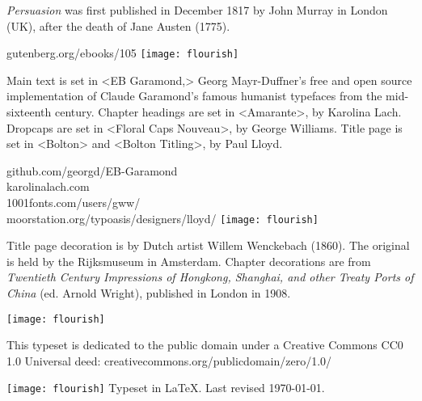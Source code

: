 \documentclass[
paper=5.5in:8.5in
]{scrbook}
\begin{document}
\vfill
\begin{minipage}{\textwidth}
\textit{Persuasion} was first published in December 1817 by John Murray in London (UK), after the death of Jane Austen (1775).
\end{minipage}
\vfill
gutenberg.org/ebooks/105
\vfill
\texttt{[image: flourish]}
\vfill
\begin{minipage}{\textwidth}
Main text is set in <EB Garamond,> Georg Mayr-Duffner's free and open source implementation of Claude Garamond’s famous humanist typefaces from the mid-sixteenth century. Chapter headings are set in <Amarante>, by Karolina Lach. Dropcaps are set in <Floral Caps Nouveau>, by George Williams. Title page is set in <Bolton> and <Bolton Titling>, by Paul Lloyd.
\end{minipage}
\vfill
github.com/georgd/EB-Garamond\\
karolinalach.com\\
1001fonts.com/users/gww/\\
moorstation.org/typoasis/designers/lloyd/
\vfill
\texttt{[image: flourish]}
\vfill
\begin{minipage}{\textwidth}
Title page decoration is by Dutch artist Willem Wenckebach (1860). The original is held by the Rijksmuseum in Amsterdam. Chapter decorations are from \textit{Twentieth Century Impressions of Hongkong, Shanghai, and other Treaty Ports of China} (ed. Arnold Wright), published in London in 1908.
\end{minipage}
\vfill
\texttt{[image: flourish]}
\vfill
\begin{minipage}{\textwidth}
This typeset is dedicated to the public domain under a Creative Commons CC0 1.0 Universal deed: creativecommons.org/publicdomain/zero/1.0/
\end{minipage}
\vfill
\texttt{[image: flourish]}
\vfill
Typeset in \LaTeX{}. Last revised \today.
\thispagestyle{empty}
\end{document}
